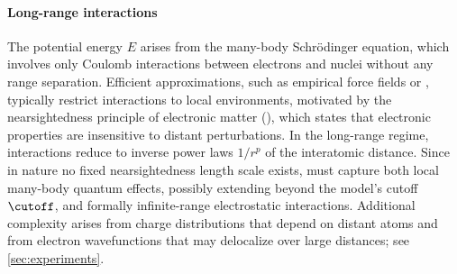 \documentclass[10pt]{article}
\begin{document}
\paragraph{Long-range interactions}
The potential energy $E$ arises from the many-body Schrödinger equation, which involves only Coulomb interactions between electrons and nuclei without any range separation.
Efficient approximations, such as empirical force fields or \mlps, typically restrict interactions to local environments, motivated by the nearsightedness principle of electronic matter (\cite{pk2005}), which states that electronic properties are insensitive to distant perturbations.
In the long-range regime, interactions reduce to inverse power laws $1/r^p$ of the interatomic distance.
Since in nature no fixed nearsightedness length scale exists, \mlps must capture both local many-body quantum effects, possibly extending beyond the model's cutoff $\cutoff$, and formally infinite-range electrostatic interactions.
Additional complexity arises from charge distributions that depend on distant atoms and from electron wavefunctions that may delocalize over large distances; see \cref{sec:experiments}.
\end{document}
